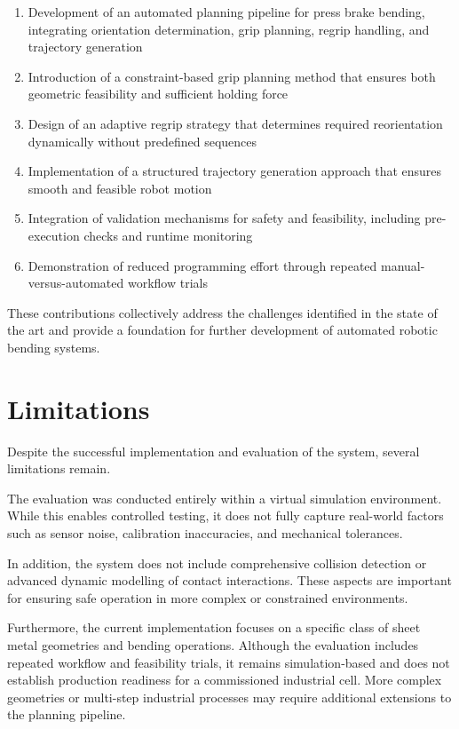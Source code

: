 \begin{enumerate}
\item Development of an automated planning pipeline for press brake bending, integrating orientation determination, grip planning, regrip handling, and trajectory generation

\item Introduction of a constraint-based grip planning method that ensures both geometric feasibility and sufficient holding force

\item Design of an adaptive regrip strategy that determines required reorientation dynamically without predefined sequences

\item Implementation of a structured trajectory generation approach that ensures smooth and feasible robot motion

\item Integration of validation mechanisms for safety and feasibility, including pre-execution checks and runtime monitoring

\item Demonstration of reduced programming effort through repeated manual-versus-automated workflow trials
\end{enumerate}

These contributions collectively address the challenges identified in the state of the art and provide a foundation for further development of automated robotic bending systems.

\section{Limitations}
\label{sec:thesis-limitations}

Despite the successful implementation and evaluation of the system, several limitations remain.

The evaluation was conducted entirely within a virtual simulation environment. While this enables controlled testing, it does not fully capture real-world factors such as sensor noise, calibration inaccuracies, and mechanical tolerances.

In addition, the system does not include comprehensive collision detection or advanced dynamic modelling of contact interactions. These aspects are important for ensuring safe operation in more complex or constrained environments.

Furthermore, the current implementation focuses on a specific class of sheet metal geometries and bending operations. Although the evaluation includes repeated workflow and feasibility trials, it remains simulation-based and does not establish production readiness for a commissioned industrial cell. More complex geometries or multi-step industrial processes may require additional extensions to the planning pipeline.

